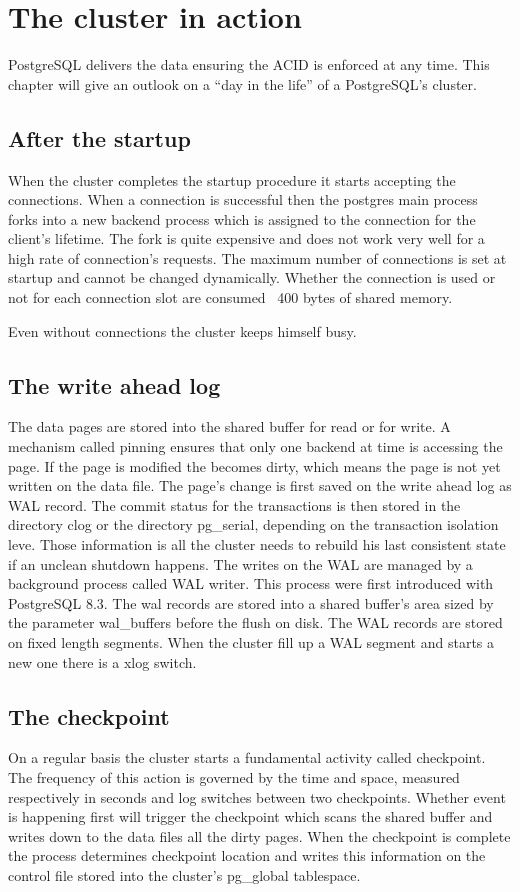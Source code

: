 \chapter{The cluster in action}
PostgreSQL delivers the data ensuring the ACID is enforced at any time. This chapter will give an outlook 
on a ``day in the life'' of a PostgreSQL's cluster.

\section{After the startup}
When the cluster completes the startup procedure it starts accepting the connections. When a connection  
is successful then the postgres main process forks into a new backend process which is assigned to the 
connection for the client's lifetime. The fork is quite expensive and does not work very well for a high 
rate of connection's requests. The maximum number of connections is set at startup and cannot be changed 
dynamically. Whether the connection is used or not for each connection slot are consumed ~400 bytes of 
shared memory.\newline

Even without connections the cluster keeps himself busy. 

\section{The write ahead log}
The  data pages are stored into the shared buffer for read or for write. A mechanism 
called pinning ensures that only one backend at time is accessing the page. If the page 
is modified the becomes dirty, which 
means the page is not yet written on the data file. The page's change is first saved on the write ahead log 
as WAL record. The commit status for the transactions is then stored in the directory clog or the directory
pg\_serial, depending on the transaction isolation leve. Those information is all the cluster needs to 
rebuild his last consistent state if an unclean shutdown happens. The writes on the WAL are managed by a 
background process called WAL writer. This process were first introduced with PostgreSQL 
8.3. The wal records are stored into a shared buffer's area sized by the parameter wal\_buffers before the 
flush on disk. The WAL records are stored on fixed length segments. When the cluster fill up a WAL segment 
and starts a new one there is a xlog switch.

\section{The checkpoint}
On a regular basis the cluster starts a fundamental activity called checkpoint. The frequency of this 
action is governed by the time and space, measured respectively in seconds and log switches between two 
checkpoints. Whether event is happening first will trigger the checkpoint which scans the shared buffer 
and writes down to the data files all the dirty pages. When the checkpoint is complete the process 
determines checkpoint location and writes this information on the control file stored into the 
cluster's pg\_global tablespace. 


